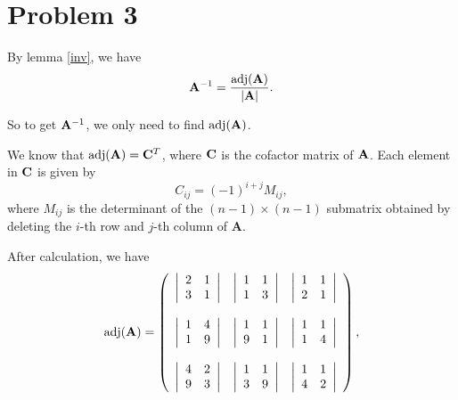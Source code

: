 \documentclass[12pt,a4paper]{article}
\begin{document}
\section*{Problem 3}
\begin{solution}
By lemma \ref{inv}, we have
\[
\mathbf{A}^{-1} = \frac{\operatorname{adj}(\mathbf{A})}{|\mathbf{A}|}.
\]

So to get  $\mathbf{A}^{-1}$, we only need to find $\operatorname{adj}(\mathbf{A})$.

We know that $\operatorname{adj}(\mathbf{A}) = \mathbf{C}^T$, where $\mathbf{C}$ is the cofactor matrix of $\mathbf{A}$. Each element in $\mathbf{C}$ is given by
$$
C_{i j}=(-1)^{i+j} M_{i j},
$$
where $M_{i j}$ is the determinant of the $(n-1) \times(n-1)$ submatrix obtained by deleting the $i$-th row and $j$-th column of $\mathbf{A}$.

After calculation, we have 
\[
\operatorname{adj}(\mathbf{A})=
\left(
\begin{array}{ccc}
 \left| 
\begin{array}{cc}
 2 & 1 \\
 3 & 1 \\
\end{array}
\right|  & \left| 
\begin{array}{cc}
 1 & 1 \\
 1 & 3 \\
\end{array}
\right|  & \left| 
\begin{array}{cc}
 1 & 1 \\
 2 & 1 \\
\end{array}
\right|  \\ \\
 \left| 
\begin{array}{cc}
 1 & 4 \\
 1 & 9 \\
\end{array}
\right|  & \left| 
\begin{array}{cc}
 1 & 1 \\
 9 & 1 \\
\end{array}
\right|  & \left| 
\begin{array}{cc}
 1 & 1 \\
 1 & 4 \\
\end{array}
\right|  \\ \\
 \left| 
\begin{array}{cc}
 4 & 2 \\
 9 & 3 \\
\end{array}
\right|  & \left| 
\begin{array}{cc}
 1 & 1 \\
 3 & 9 \\
\end{array}
\right|  & \left| 
\begin{array}{cc}
 1 & 1 \\
 4 & 2 \\
\end{array}
\right|  \\
\end{array}
\right),
\]


\end{solution}
\end{document}
